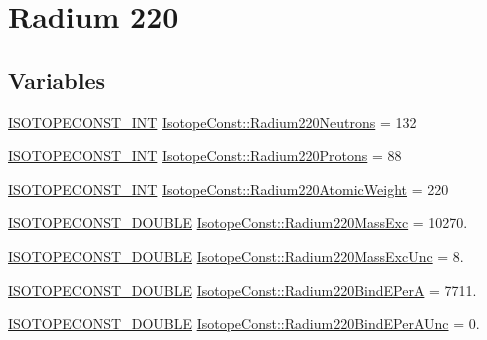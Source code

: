 \hypertarget{group___isotope_const-_radium-_ra220}{}\section{Radium 220}
\label{group___isotope_const-_radium-_ra220}
\subsection*{Variables}
\begin{DoxyCompactItemize}
\item 
\mbox{\hyperlink{group___isotope_const-_macros_ga5f18360b3e99483a35c32d789e62621c}{I\+S\+O\+T\+O\+P\+E\+C\+O\+N\+S\+T\+\_\+\+I\+NT}} \mbox{\hyperlink{group___isotope_const-_radium-_ra220_gaf3e269c35ff69f66d6a70730557e04ac}{Isotope\+Const\+::\+Radium220\+Neutrons}} = 132
\item 
\mbox{\hyperlink{group___isotope_const-_macros_ga5f18360b3e99483a35c32d789e62621c}{I\+S\+O\+T\+O\+P\+E\+C\+O\+N\+S\+T\+\_\+\+I\+NT}} \mbox{\hyperlink{group___isotope_const-_radium-_ra220_gaa4b2aa9e92314625aa124a0439785d11}{Isotope\+Const\+::\+Radium220\+Protons}} = 88
\item 
\mbox{\hyperlink{group___isotope_const-_macros_ga5f18360b3e99483a35c32d789e62621c}{I\+S\+O\+T\+O\+P\+E\+C\+O\+N\+S\+T\+\_\+\+I\+NT}} \mbox{\hyperlink{group___isotope_const-_radium-_ra220_ga596f48ee5baf29a7ec5c5016b96a146e}{Isotope\+Const\+::\+Radium220\+Atomic\+Weight}} = 220
\item 
\mbox{\hyperlink{group___isotope_const-_macros_ga8f45a7272ce02c0b4c65c44636ed719a}{I\+S\+O\+T\+O\+P\+E\+C\+O\+N\+S\+T\+\_\+\+D\+O\+U\+B\+LE}} \mbox{\hyperlink{group___isotope_const-_radium-_ra220_gab6e80910d4057d14f43286634e6b43d4}{Isotope\+Const\+::\+Radium220\+Mass\+Exc}} = 10270.
\item 
\mbox{\hyperlink{group___isotope_const-_macros_ga8f45a7272ce02c0b4c65c44636ed719a}{I\+S\+O\+T\+O\+P\+E\+C\+O\+N\+S\+T\+\_\+\+D\+O\+U\+B\+LE}} \mbox{\hyperlink{group___isotope_const-_radium-_ra220_ga04503913755071986e13edb7d8b70030}{Isotope\+Const\+::\+Radium220\+Mass\+Exc\+Unc}} = 8.
\item 
\mbox{\hyperlink{group___isotope_const-_macros_ga8f45a7272ce02c0b4c65c44636ed719a}{I\+S\+O\+T\+O\+P\+E\+C\+O\+N\+S\+T\+\_\+\+D\+O\+U\+B\+LE}} \mbox{\hyperlink{group___isotope_const-_radium-_ra220_ga4a301426eb805701d13fe1546452b263}{Isotope\+Const\+::\+Radium220\+Bind\+E\+PerA}} = 7711.
\item 
\mbox{\hyperlink{group___isotope_const-_macros_ga8f45a7272ce02c0b4c65c44636ed719a}{I\+S\+O\+T\+O\+P\+E\+C\+O\+N\+S\+T\+\_\+\+D\+O\+U\+B\+LE}} \mbox{\hyperlink{group___isotope_const-_radium-_ra220_gada88eeef8b62904615ffc02dd121cf28}{Isotope\+Const\+::\+Radium220\+Bind\+E\+Per\+A\+Unc}} = 0.

\end{DoxyCompactItemize}
